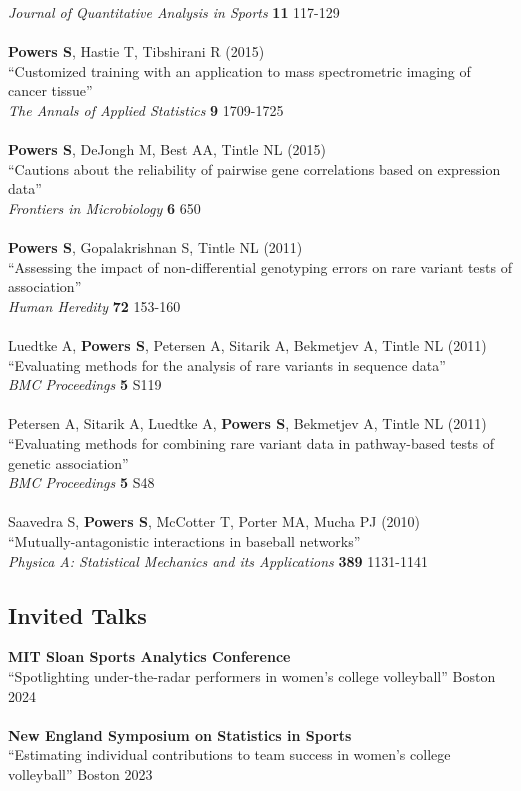 \documentclass{article}
\begin{document}
{\it Journal of Quantitative Analysis in Sports} {\bf 11} 117-129\\
~\\
{\bf Powers S}, Hastie T, Tibshirani R (2015)\\
``Customized training with an application to mass spectrometric imaging of cancer tissue''\\
{\it The Annals of Applied Statistics} {\bf 9} 1709-1725\\
~\\
{\bf Powers S}, DeJongh M, Best AA, Tintle NL (2015)\\
``Cautions about the reliability of pairwise gene correlations based on expression data''\\
{\it Frontiers in Microbiology} {\bf 6} 650\\
~\\
{\bf Powers S}, Gopalakrishnan S, Tintle NL (2011)\\
``Assessing the impact of non-differential genotyping errors on rare variant tests of association''\\
{\it Human Heredity} {\bf 72} 153-160\\
~\\
Luedtke A, {\bf Powers S}, Petersen A, Sitarik A, Bekmetjev A, Tintle NL (2011)\\
``Evaluating methods for the analysis of rare variants in sequence data''\\
{\it BMC Proceedings} {\bf 5} S119\\
~\\
Petersen A, Sitarik A, Luedtke A, {\bf Powers S}, Bekmetjev A, Tintle NL (2011)\\
``Evaluating methods for combining rare variant data in pathway-based tests of genetic association''\\
{\it BMC Proceedings} {\bf 5} S48\\
~\\
Saavedra S, {\bf Powers S}, McCotter T, Porter MA, Mucha PJ (2010)\\
``Mutually-antagonistic interactions in baseball networks''\\
{\it Physica A: Statistical Mechanics and its Applications} {\bf 389} 1131-1141

\subsection*{\sc Invited Talks}

{\bf MIT Sloan Sports Analytics Conference}\\
``Spotlighting under-the-radar performers in women's college volleyball'' \hfill Boston 2024\\
~\\
{\bf New England Symposium on Statistics in Sports}\\
``Estimating individual contributions to team success in women's college volleyball'' \hfill Boston 2023
\end{document}
